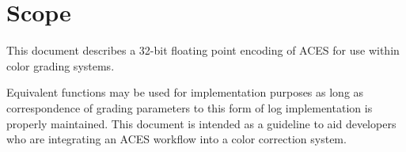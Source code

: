 \cleardoublepage
\numberedformat	
\chapter{Scope} 	%

This document describes a 32-bit floating point encoding of ACES for use within color grading systems. 

Equivalent functions may be used for implementation purposes as long as correspondence of grading parameters to this form of log implementation is properly maintained. This document is intended as a guideline to aid developers who are integrating an ACES workflow into a color correction system.